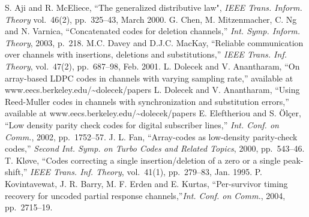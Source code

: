 \begin{thebibliography}{17}

S. Aji and R. McEliece, ``The generalized distributive law",
\emph{IEEE Trans.  Inform. Theory} vol.\ 46(2), pp.~325--43, March
2000.
G. Chen, M. Mitzenmacher, C. Ng and N. Varnica, ``Concatenated
codes for deletion channels,'' \emph{Int. Symp. Inform. Theory},
2003, p.~218.%
M.C. Davey and D.J.C. MacKay, ``Reliable communication over
channels with insertions, deletions and substitutions,''
\emph{IEEE Trans. Inf. Theory}, vol.\ 47(2), pp.~687--98, Feb.
2001.
 L. Dolecek and V. Anantharam, ``On array-based LDPC codes in channels
with varying sampling rate,'' available at
www.eecs.berkeley.edu/\~{}dolecek/papers
 L. Dolecek and V. Anantharam, ``Using Reed-Muller codes in channels with synchronization and substitution errors,'' available at www.eecs.berkeley.edu/\~{}dolecek/papers
E. Eleftheriou and S. \"{O}l\c{c}er, ``Low density parity check
codes for digital subscriber lines,'' \emph{Int. Conf. on Comm.},
2002, pp.~1752--57.
J. L. Fan, ``Array-codes as low-density parity-check codes,''
\emph{Second Int. Symp. on Turbo Codes and Related Topics}, 2000,
pp.~543--46.
T. Kl{\o}ve, ``Codes correcting a single insertion/deletion of a
zero or a single peak-shift,'' \emph{IEEE Trans. Inf. Theory},
vol.\ 41(1), pp.~279--83, Jan. 1995.
P. Kovintavewat, J. R. Barry, M. F. Erden and E. Kurtas,
``Per-survivor timing recovery for uncoded partial response
channels,''\emph{Int. Conf. on Comm.}, 2004, pp.~2715--19.%

\end{thebibliography}

